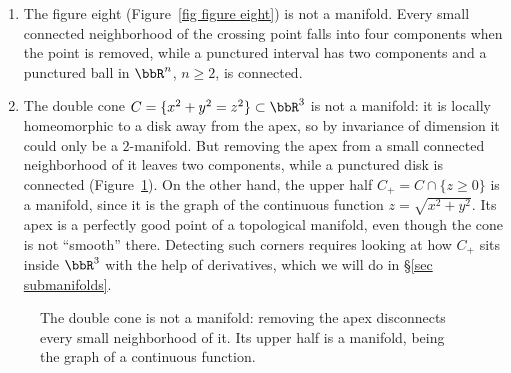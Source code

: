 \begin{example}\label{example non-manifolds}
    \begin{enumerate}
        \item The figure eight (Figure~\ref{fig figure eight}) is not a manifold. Every small connected neighborhood of the crossing point falls into four components when the point is removed, while a punctured interval has two components and a punctured ball in $\bbR^n$, $n\geq2$, is connected.
        \item The double cone $C=\{x^2+y^2=z^2\}\subset\bbR^3$ is not a manifold: it is locally homeomorphic to a disk away from the apex, so by invariance of dimension it could only be a $2$-manifold. But removing the apex from a small connected neighborhood of it leaves two components, while a punctured disk is connected (Figure~\ref{fig double cone}). On the other hand, the upper half $C_+=C\cap\{z\geq0\}$ is a manifold, since it is the graph of the continuous function $z=\sqrt{x^2+y^2}$. Its apex is a perfectly good point of a topological manifold, even though the cone is not ``smooth'' there. Detecting such corners requires looking at how $C_+$ sits inside $\bbR^3$ with the help of derivatives, which we will do in \S\ref{sec submanifolds}.
    \end{enumerate}
\end{example}

\begin{figure}[tp]
    \centering
    \caption{The double cone is not a manifold: removing the apex disconnects every small neighborhood of it. Its upper half is a manifold, being the graph of a continuous function.}
    \label{fig double cone}
\end{figure}

